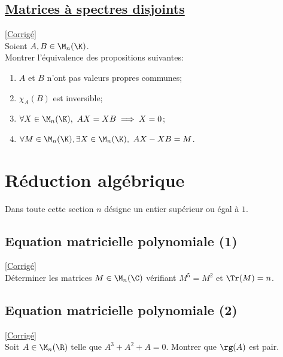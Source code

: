 \documentclass[8pt]{book}
\begin{document}
	\section{\underline{Matrices à spectres disjoints} }
	\label{Matrices à spectres disjoints}
	\textcolor{blue}{\hyperref[Matrices à spectres disjoints corrigé]{[Corrigé]}}\\
	Soient $A,B\in \M_n(\K)$.\\ Montrer l'équivalence des propositions suivantes:
	\begin{enumerate}[label=(\roman*)]
		\item $A$ et $B$ n'ont pas valeurs propres communes;
		\item $\chi_A(B)$ est inversible;
		\item $\forall X\in \M_n(\K),\ AX=XB\implies X=0$;
		\item $\forall M\in \M_n(\K),\exists X\in \M_n(\K),\ AX-XB=M$.
	\end{enumerate}
	
	

\chapter{Réduction algébrique}
	Dans toute cette section $n$ désigne un entier supérieur ou égal à $1$.\\
	
 	\section{Equation matricielle polynomiale (1) }
 	\label{Equation matricielle polynomiale (1)}
 	\textcolor{blue}{\hyperref[Equation matricielle polynomiale (1) corrigé]{[Corrigé]}}\\
	Déterminer les matrices $M\in \M_n(\C)$ vérifiant $M^5=M^2$ et $\Tr(M)=n$.
	
	\section{Equation matricielle polynomiale (2) }
	\label{Equation matricielle polynomiale (2)}
	\textcolor{blue}{\hyperref[Equation matricielle polynomiale (2) corrigé]{[Corrigé]}}\\
	Soit $A\in \M_n(\R)$ telle que $A^3+A^2+A=0$. Montrer que $\rg(A)$ est pair.
	
\end{document}
